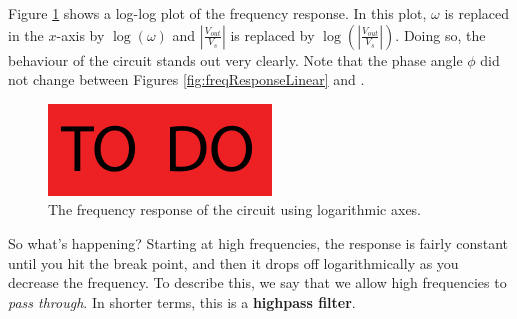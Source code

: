Figure \ref{fig:freqResponseLog} shows a log-log plot of the frequency response. In this plot, $\omega$ is replaced in the $x$-axis by $\log(\omega)$ and $\left|\frac{V_{out}}{V_s}\right|$ is replaced by $\log\left(\left|\frac{V_{out}}{V_s}\right|\right)$.  Doing so, the behaviour of the circuit stands out very clearly.  Note that the phase angle $\phi$ did not change between Figures \ref{fig:freqResponseLinear} and \label{fig:freqResponseLog}.

\begin{figure}
   \centering
  \includegraphics{figures/toDo}
  \caption{The frequency response of the circuit using logarithmic axes.}
  \label{fig:freqResponseLog}
\end{figure}

So what's happening?  Starting at high frequencies, the response is fairly constant until you hit the break point, and then it drops off logarithmically as you decrease the frequency.  To describe this, we say that we allow high frequencies to {\it pass through}.  In shorter terms, this is a {\bf highpass filter}.

